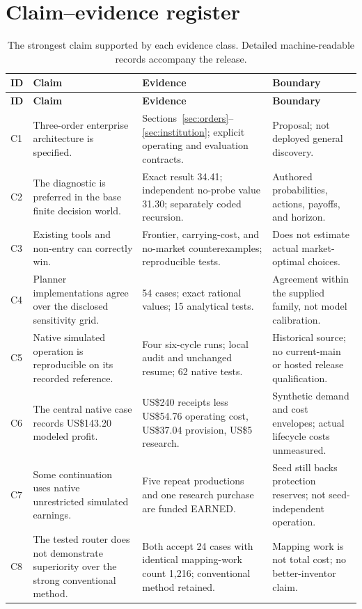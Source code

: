 \documentclass[11pt,letterpaper]{article}
\theoremstyle{remark}\newtheorem{remark}{Remark}[section]
\begin{document}
\section{Claim--evidence register}
\small
\begin{longtable}{P{.8cm}P{4.3cm}P{6.0cm}P{4.0cm}}
\caption{The strongest claim supported by each evidence class. Detailed machine-readable records accompany the release.}\label{tab:claims}\\
\toprule
\textbf{ID}&\textbf{Claim}&\textbf{Evidence}&\textbf{Boundary}\\
\midrule\endfirsthead
\toprule\textbf{ID}&\textbf{Claim}&\textbf{Evidence}&\textbf{Boundary}\\\midrule\endhead
C1 & Three-order enterprise architecture is specified. & Sections~\ref{sec:orders}--\ref{sec:institution}; explicit operating and evaluation contracts. & Proposal; not deployed general discovery.\\
C2 & The diagnostic is preferred in the base finite decision world. & Exact result 34.41; independent no-probe value 31.30; separately coded recursion. & Authored probabilities, actions, payoffs, and horizon.\\
C3 & Existing tools and non-entry can correctly win. & Frontier, carrying-cost, and no-market counterexamples; reproducible tests. & Does not estimate actual market-optimal choices.\\
C4 & Planner implementations agree over the disclosed sensitivity grid. & 54 cases; exact rational values; 15 analytical tests. & Agreement within the supplied family, not model calibration.\\
C5 & Native simulated operation is reproducible on its recorded reference. & Four six-cycle runs; local audit and unchanged resume; 62 native tests. & Historical source; no current-main or hosted release qualification.\\
C6 & The central native case records US\$143.20 modeled profit. & US\$240 receipts less US\$54.76 operating cost, US\$37.04 provision, US\$5 research. & Synthetic demand and cost envelopes; actual lifecycle costs unmeasured.\\
C7 & Some continuation uses native unrestricted simulated earnings. & Five repeat productions and one research purchase are funded EARNED. & Seed still backs protection reserves; not seed-independent operation.\\
C8 & The tested router does not demonstrate superiority over the strong conventional method. & Both accept 24 cases with identical mapping-work count 1,216; conventional method retained. & Mapping work is not total cost; no better-inventor claim.\\

\end{longtable}
\end{document}
